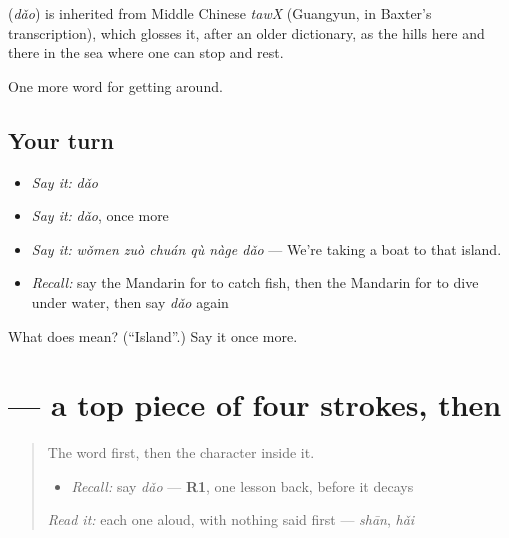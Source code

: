 \begin{cousinweb}
\textbf{} (\emph{dǎo}) is inherited from Middle Chinese \emph{tawX} (Guangyun, in Baxter's transcription), which glosses it, after an older dictionary, as the hills here and there in the sea where one can stop and rest.
\end{cousinweb}

\begin{grammarlens}[title={What you've built}]
One more word for getting around.
\end{grammarlens}

\subsection*{Your turn}
\begin{itemize}
\raggedright
  \item \emph{Say it:} \emph{dǎo}
  \item \emph{Say it:} \emph{dǎo}, once more
  \item \emph{Say it:} \emph{wǒmen zuò chuán qù nàge dǎo} — We're taking a boat to that island.
  \item \emph{Recall:} say the Mandarin for to catch fish, then the Mandarin for to dive under water, then say \emph{dǎo} again
\end{itemize}

\begin{tcolorbox}[breakable,colback=teal!4,colframe=teal!35!black,title={Before you move on}]
What does  mean? (\textquotedblleft{}Island\textquotedblright{}.) Say it once more.
\end{tcolorbox}
\section[\texorpdfstring{\zh{岛} (dǎo)}{岛 (dǎo)}]{ — a top piece of four strokes, then }

\label{lesson:ZH-W444-dao-island}



\begin{quote}
The word first, then the character inside it.

\begin{itemize}
\raggedright
  \item \emph{Recall:} say \emph{dǎo} — \textbf{R1}, one lesson back, before it decays
\end{itemize}

\begin{quote}
 
\end{quote}

\emph{Read it:} each one aloud, with nothing said first — \emph{shān}, \emph{hǎi}
\end{quote}

